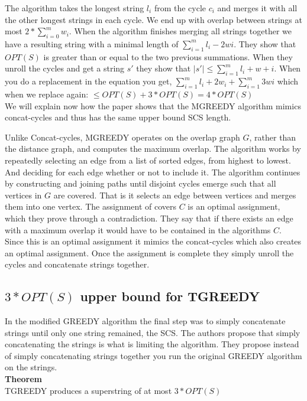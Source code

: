 \documentclass[letterpaper,11pt,titlepage]{article}
\begin{document}
The algorithm takes the longest string $l_i$ from the cycle $c_i$ and merges it with all the other longest strings in each cycle. We end up with overlap between strings at most $2*\sum_{i=0}^m w_i$. When the algorithm finishes merging all strings together we have a resulting string with a minimal length of $\sum_{i=1}^m l_i - 2wi$.  They show that $OPT(S)$ is greater than or equal to the two previous summations. When they unroll the cycles and get a string $s'$ they show that $|s'| \leq \sum_{i=1}^m l_i + w+i$. When you do a replacement in the equation you get, $\sum_{i=1}^m l_i + 2w_i + \sum_{i=1}^m 3wi$ which when we replace again: $\leq OPT(S) + 3 * OPT(S) = 4 * OPT(S)$\\

We will explain now how the paper shows that the MGREEDY algorithm mimics concat-cycles and thus has the same upper bound SCS length.

Unlike Concat-cycles, MGREEDY operates on the overlap graph $G$, rather than the distance graph, and computes the maximum overlap. The algorithm works by repeatedly selecting an edge from a list of sorted edges, from highest to lowest. And deciding for each edge whether or not to include it. The algorithm continues by constructing and joining paths until disjoint cycles emerge such that all vertices in $G$ are covered. That is it selects an edge between vertices and merges them into one vertex. The assignment of covers $C$ is an optimal assignment, which they prove through a contradiction. They say that if there exists an edge with a maximum overlap it would have to be contained in the algorithms $C$. Since this is an optimal assignment it mimics the concat-cycles which also creates an optimal assignment. Once the assignment is complete they simply unroll the cycles and concatenate strings together. 

\subsection*{$3 * OPT(S)$ upper bound for TGREEDY}

In the modified GREEDY algorithm the final step was to simply concatenate strings until only one string remained, the SCS. The authors propose that simply concatenating the strings is what is limiting the algorithm. They propose instead of simply concatenating strings together you run the original GREEDY algorithm on the strings. \\

\textbf{Theorem}\\
TGREEDY produces a superstring of at most $3 * OPT(S)$\\
\end{document}
